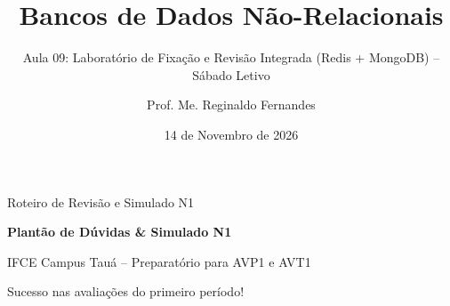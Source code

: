 \documentclass[aspectratio=169,t]{beamer}
\author{Prof. Me. Reginaldo Fernandes}
\institute{Instituto Federal do Ceará -- Campus Tauá \\ Tecnologia em Análise e Desenvolvimento de Sistemas}
\title{Bancos de Dados Não-Relacionais}
\subtitle{Aula 09: Laboratório de Fixação e Revisão Integrada (Redis + MongoDB) -- Sábado Letivo}
\date{14 de Novembro de 2026}
\begin{document}

\frame[plain]{\titlepage}

\begin{frame}{Roteiro de Revisão e Simulado N1}
  \vspace{0.3cm}
  \tableofcontents
\end{frame}







\begin{frame}[plain]
  \vspace{2cm}
  \centering
  {\Huge \textbf{Plantão de Dúvidas \& Simulado N1}}\par
  \vspace{0.8cm}
  {\large IFCE Campus Tauá -- Preparatório para AVP1 e AVT1}\par
  \vspace{0.3cm}
  {\normalsize Sucesso nas avaliações do primeiro período!}
\end{frame}
\end{document}
